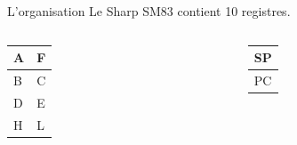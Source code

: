 \documentclass{beamer}
\begin{document}
    \begin{frame}{L'organisation}
        Le Sharp SM83 contient 10 registres.
        \begin{columns}
            \begin{column}{0.5\textwidth}
                \begin{center}
                    \begin{tabular}{ | m{1.5cm} | m{1.5cm} | } 
                        \hline
                        A & F \\ 
                        \hline
                        B & C \\ 
                        \hline
                        D & E \\ 
                        \hline
                        H & L \\
                        \hline
                    \end{tabular}
                \end{center}
            \end{column}
            \begin{column}{0.5\textwidth}
                \begin{center}
                    \begin{tabular}{ | m{1.5cm} | }
                        \hline
                        SP \\ 
                        \hline
                        PC \\ 
                        \hline
                    \end{tabular}
                \end{center}
            \end{column}
        \end{columns}
    \end{frame}
\end{document}
